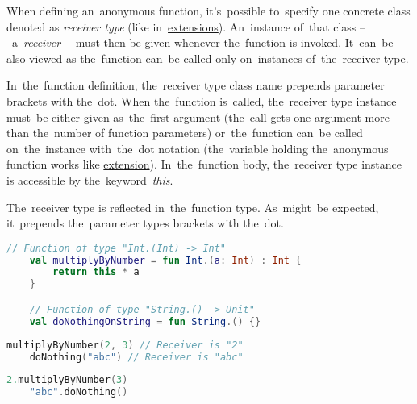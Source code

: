\label{kotlinanonymousreceivertype}
When defining an~anonymous function, it's~possible to~specify one concrete class denoted as \textit{receiver type} (like in~\hyperref[kotlinextensions]{extensions}).
An~instance of~that class --~a~\textit{receiver} --~must then be given whenever the~function is invoked.
It~can~be also viewed as the~function can~be called only on~instances of~the~receiver type.

In~the~function definition, the~receiver type class name prepends parameter brackets with the~dot.
When the~function is~called, the~receiver type instance must~be either given as~the~first argument (the~call gets one argument more than the~number of function parameters) or~the~function can~be called on~the~instance with~the~dot notation (the~variable holding the~anonymous function works like \hyperref[kotlinextensions]{extension}).
In~the~function body, the~receiver type instance is accessible by the~keyword~\textit{this}.

The~receiver type is reflected in~the~function type.
As~might~be expected, it~prepends the~parameter types brackets with the~dot.
\newline

\example
\begin{lstlisting}[language=Kotlin]
    // Function of type "Int.(Int) -> Int"
    val multiplyByNumber = fun Int.(a: Int) : Int {
        return this * a
    }

    // Function of type "String.() -> Unit"
    val doNothingOnString = fun String.() {}
\end{lstlisting}
\newline

\begin{lstlisting}[language=Kotlin, title={Usage with passing receivers as arguments}]
    multiplyByNumber(2, 3) // Receiver is "2"
    doNothing("abc") // Receiver is "abc"
\end{lstlisting}
\newline

\begin{lstlisting}[language=Kotlin, title={Equivalent with calling on receivers}]
    2.multiplyByNumber(3)
    "abc".doNothing()
\end{lstlisting}
\newpage
